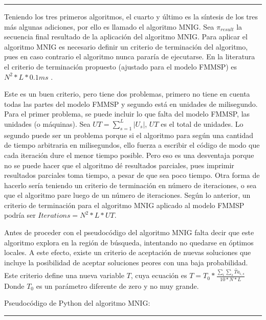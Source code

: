 \documentclass{article}
\begin{document}
\noindent\noindent
\rule{\linewidth}{0.4pt}

\vspace{\baselineskip}
Teniendo los tres primeros algoritmos, el cuarto y último es la síntesis de los tres más algunas adiciones, por ello es llamado el algoritmo MNIG. Sea $\pi_{result}$ la secuencia final resultado de la aplicación del algoritmo MNIG. Para aplicar el algoritmo MNIG es necesario definir un criterio de terminación del algoritmo, pues en caso contrario el algoritmo nunca pararía de ejecutarse. En la literatura el criterio de terminación propuesto (ajustado para el modelo FMMSP) es $N^2*L*0.1ms$ \autocite{algMNIG}. 

\vspace{\baselineskip}
Este es un buen criterio, pero tiene dos problemas, primero no tiene en cuenta todas las partes del modelo FMMSP y segundo está en unidades de milisegundo. Para el primer problema, se puede incluir lo que falta del modelo FMMSP, las unidades (o máquinas). Sea $UT = \sum_{s = 1}^{L}|U_{s}|$, $UT$ es el total de unidades. Lo segundo puede ser un problema porque si el algoritmo para según una cantidad de tiempo arbitraria en milisegundos, ello fuerza a escribir el código de modo que cada iteración dure el menor tiempo posible. Pero eso es una desventaja porque no se puede hacer que el algoritmo dé resultados parciales, pues imprimir resultados parciales toma tiempo, a pesar de que sea poco tiempo. Otra forma de hacerlo sería teniendo un criterio de terminación en número de iteraciones, o sea que el algoritmo pare luego de un número de iteraciones. Según lo anterior, un criterio de terminación para el algoritmo MNIG aplicado al modelo FMMSP podría ser $Iterations = N^2*L*UT$.

\vspace{\baselineskip}
Antes de proceder con el pseudocódigo del algoritmo MNIG falta decir que este algoritmo explora en la región de búsqueda, intentando no quedarse en óptimos locales. A este efecto, existe un criterio de aceptación de nuevas soluciones que incluye la posibilidad de aceptar soluciones peores con una baja probabilidad. Este criterio define una nueva variable $T$, cuya ecuación es $T = T_{0}*\frac{\sum_{i}\sum_{s}\widetilde{Ta}_{i,s}}{10*N*L}$ Donde $T_{0}$ es un parámetro diferente de zero y no muy grande. \autocite{algMNIG}

\vspace{\baselineskip}
Pseudocódigo de Python del algoritmo MNIG:

\noindent\noindent
\rule{\linewidth}{0.4pt}
\end{document}
